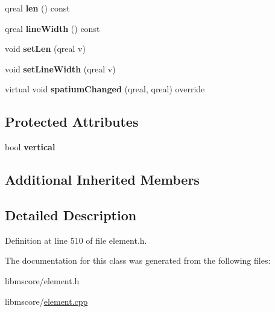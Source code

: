 \begin{DoxyCompactItemize}
\mbox{\label{class_ms_1_1_line_aabc5e399d78c2debdb94ac559ad5e677}} 
qreal {\bfseries len} () const
\item 
\mbox{\label{class_ms_1_1_line_a4a2d93ee48e13f6d5def1432fbd2f908}} 
qreal {\bfseries line\+Width} () const
\item 
\mbox{\label{class_ms_1_1_line_af9a9646736e6fb27e1ed9bb2dd65e078}} 
void {\bfseries set\+Len} (qreal v)
\item 
\mbox{\label{class_ms_1_1_line_aa7a4682b948b600824652afaabe79fde}} 
void {\bfseries set\+Line\+Width} (qreal v)
\item 
\mbox{\label{class_ms_1_1_line_ae863006d39fcd64192cdfa5c65b574c0}} 
virtual void {\bfseries spatium\+Changed} (qreal, qreal) override
\end{DoxyCompactItemize}
\subsection*{Protected Attributes}
\begin{DoxyCompactItemize}
\item 
\mbox{\label{class_ms_1_1_line_a455063a3c4678f884e0ddf1af92519e0}} 
bool {\bfseries vertical}
\end{DoxyCompactItemize}
\subsection*{Additional Inherited Members}


\subsection{Detailed Description}


Definition at line 510 of file element.\+h.



The documentation for this class was generated from the following files\+:\begin{DoxyCompactItemize}
\item 
libmscore/element.\+h\item 
libmscore/\hyperlink{element_8cpp}{element.\+cpp}\end{DoxyCompactItemize}
